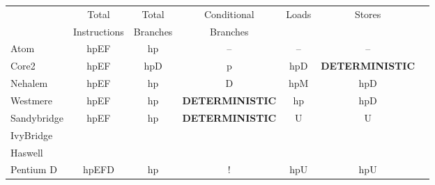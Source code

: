 \begin{tabular}{|l||c|c|c|c|c|c|}

\hline
            	&
Total		&
Total		&
Conditional	&
\multirow{2}{*}{Loads}			&
\multirow{2}{*}{Stores}			\\


	&
Instructions	&
Branches	&
Branches	&
	&
	\\


\hline
\hline


Atom	& 
hpEF	& %
hp	& %
--	& %
--	& %
--	\\ %
\hline

Core2	&
hpEF	& %
hpD	& %
p	& %
hpD	& %
{\scriptsize \bf DETERMINISTIC}	\\ %
\hline

Nehalem &
hpEF	& %
hp	& %
D	& %
hpM	& %
hpD	\\ %
\hline

Westmere	&
hpEF	& %
hp	& %
{\scriptsize \bf DETERMINISTIC}	& %
hp	& %
hpD	\\ %
\hline

Sandybridge		&
\multirow{3}{*}{hpEF}	& %
\multirow{3}{*}{hp}	& %
\multirow{3}{*}{\scriptsize \bf DETERMINISTIC}	& %
\multirow{3}{*}{U}	& %
\multirow{3}{*}{U}	\\ %

IvyBridge		&
			& %
			& %
			& %
			& %
			\\ %

Haswell			&
			& %
			& %
			& %
			& %
			\\ %
\hline

Pentium D	&
hpEFD		& %
hp		& %
!		& %
hpU		& %
hpU		\\ %
\hline


\end{tabular}
